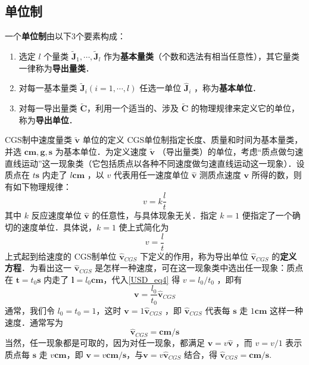 \subsection{单位制}
一个\textbf{单位制}由以下3个要素构成：
\begin{enumerate}
\item 选定 $l$ 个量类 $\tilde{\boldsymbol{J}}_1,\cdots,\tilde{\boldsymbol{J}}_l$ 作为\textbf{基本量类}（个数和选法有相当任意性），其它量类一律称为\textbf{导出量类}．  
\item 对每一基本量类 $\tilde{\boldsymbol{J}}_i(i=1,\cdots,l)$ 任选一单位 $\hat{\boldsymbol{J}}_i$ ，称为\textbf{基本单位}．
\item 对每一导出量类 $\tilde{\boldsymbol{C}}$，利用一个适当的、涉及 $\tilde{\boldsymbol{C}}$ 的物理规律来定义它的单位，称为\textbf{导出单位}．
\end{enumerate}
\begin{example}{CGS制中速度量类 $\tilde{\boldsymbol{v}
}$ 单位的定义}\label{USD_ex1}
CGS单位制指定长度、质量和时间为基本量类，并选 $\boldsymbol{cm},\boldsymbol{g},\boldsymbol{s}$ 为基本单位．为定义速度 $\tilde{\boldsymbol{v}}$ （导出量类）的单位，考虑“质点做匀速直线运动”这一现象类（它包括质点以各种不同速度做匀速直线运动这一现象）．设质点在 $t\boldsymbol{s}$ 内走了 $l\boldsymbol{cm}$ ，以 $v$ 代表用任一速度单位 $\hat{\boldsymbol{v}}$ 测质点速度 $\boldsymbol{v}$ 所得的数，则有如下物理规律：
\begin{equation}
v=k\frac{l}{t}
\end{equation}
其中 $k$ 反应速度单位 $\hat{\boldsymbol{v}}$ 的任意性，与具体现象无关．指定 $k=1$ 便指定了一个确切的速度单位．具体说，$k=1$ 使上式简化为
\begin{equation}\label{USD_eq4}
v=\frac{l}{t}
\end{equation}
上式起到给速度的 CGS制单位 $\hat{\boldsymbol{v}}_{CGS}$ 下定义的作用，称为导出单位 $\hat{\boldsymbol{v}}_{CGS}$ 的\textbf{定义方程}．为看出这一 $\hat{\boldsymbol{v}}_{CGS}$ 是怎样一种速度，可在这一现象类中选出任一现象：质点在 $\boldsymbol{t}=t_0\boldsymbol{s}$ 内走了 $\boldsymbol{l}=l_0\boldsymbol{cm}$，代入\autoref{USD_eq4} 得 $v=l_0/t_0$ ，即有
\begin{equation}
\boldsymbol{v}=\frac{l_0}{t_0}\hat{\boldsymbol{v}}_{CGS}
\end{equation}
通常，我们令 $l_0=t_0=1$，这时 $\boldsymbol{v}=1\hat{\boldsymbol{v}}_{CGS}$ ，即 $\hat{\boldsymbol{v}}_{CGS}$ 代表每 $\boldsymbol{s}$ 走 $1\boldsymbol{cm}$ 这样一种速度．通常写为
\begin{equation}
\hat{\boldsymbol{v}}_{CGS}=\boldsymbol{cm/s}
\end{equation}
当然，任一现象都是可取的，因为对任一现象，都满足 $\boldsymbol{v}=v\hat{\boldsymbol{v}}$ ，而 $v=v/1$ 表示质点每 $\boldsymbol{s}$ 走 $v\boldsymbol{cm}$，即 $\boldsymbol{v}=v\boldsymbol{cm/s}$，与$\boldsymbol{v}=v\hat{\boldsymbol{v}}_{CGS}$ 结合，得 $\hat{\boldsymbol{v}}_{CGS}=\boldsymbol{cm/s}$.

\end{example}
